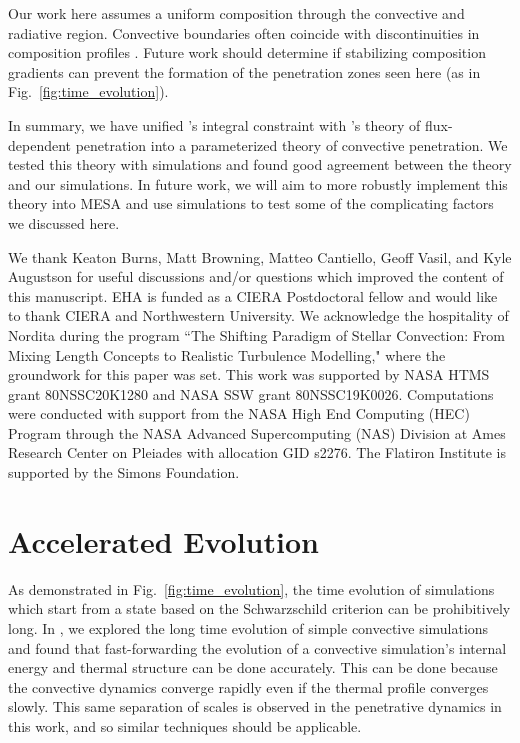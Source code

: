 \documentclass[twocolumn]{aastex631}
\begin{document}
Our work here assumes a uniform composition through the convective and radiative region.
Convective boundaries often coincide with discontinuities in composition profiles \citep{salaris_cassisi_2017}.
Future work should determine if stabilizing composition gradients can prevent the formation of the penetration zones seen here (as in Fig.~\ref{fig:time_evolution}).

In summary, we have unified \citet{roxburgh1989}'s integral constraint with \citet{zahn1991}'s theory of flux-dependent penetration into a parameterized theory of convective penetration.
We tested this theory with simulations and found good agreement between the theory and our simulations.
In future work, we will aim to more robustly implement this theory into MESA and use simulations to test some of the complicating factors we discussed here.



\begin{acknowledgments}
We thank Keaton Burns, Matt Browning, Matteo Cantiello, Geoff Vasil, and Kyle Augustson for useful discussions and/or questions which improved the content of this manuscript.
EHA is funded as a CIERA Postdoctoral fellow and would like to thank CIERA and Northwestern University. 
We acknowledge the hospitality of Nordita during the program ``The Shifting Paradigm of Stellar Convection: From Mixing Length Concepts to Realistic Turbulence Modelling," where the groundwork for this paper was set.
This work was supported by NASA HTMS grant 80NSSC20K1280 and NASA SSW grant 80NSSC19K0026.
Computations were conducted with support from the NASA High End Computing (HEC) Program through the NASA Advanced Supercomputing (NAS) Division at Ames Research Center on Pleiades with allocation GID s2276.
The Flatiron Institute is supported by the Simons Foundation.
\end{acknowledgments}


\appendix

\section{Accelerated Evolution}
\label{app:accelerated_evolution}
As demonstrated in Fig.~\ref{fig:time_evolution}, the time evolution of simulations which start from a state based on the Schwarzschild criterion can be prohibitively long.
In \citet{anders_etal_2018}, we explored the long time evolution of simple convective simulations and found that fast-forwarding the evolution of a convective simulation's internal energy and thermal structure can be done accurately.
This can be done because the convective dynamics converge rapidly even if the thermal profile converges slowly.
This same separation of scales is observed in the penetrative dynamics in this work, and so similar techniques should be applicable.
\end{document}
